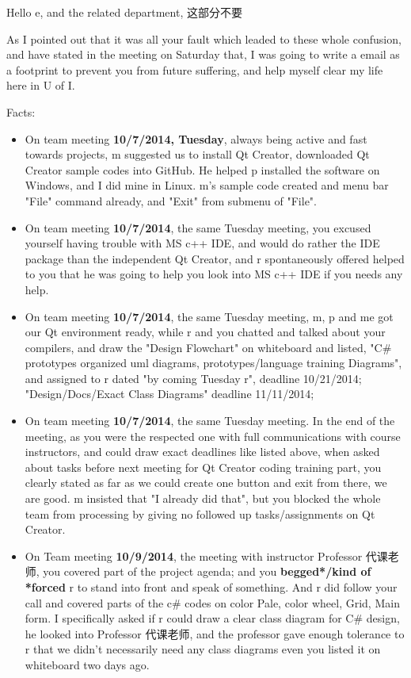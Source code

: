 \documentclass[9pt,b5paper]{article}
\begin{document}
Hello e, and the related department, 这部分不要

As I pointed out that it was all your fault which leaded to these whole confusion, and have stated in the meeting on Saturday that, I was going to write a email as a footprint to prevent you from future suffering, and help myself clear my life here in U of I. 

Facts:

\begin{itemize}
\item On team meeting \textbf{10/7/2014, Tuesday}, always being active and fast towards projects, m suggested us to install Qt Creator, downloaded Qt Creator sample codes into GitHub. He helped p installed the software on Windows, and I did mine in Linux. m's sample code created and menu bar "File" command already, and "Exit" from submenu of "File".
\item On team meeting \textbf{10/7/2014}, the same Tuesday meeting, you excused yourself having trouble with MS c++ IDE, and would do rather the IDE package than the independent Qt Creator, and r spontaneously offered helped to you that he was going to help you look into MS c++ IDE if you needs any help.

\item On team meeting \textbf{10/7/2014}, the same Tuesday meeting, m, p and me got our Qt environment ready, while r and you chatted and talked about your compilers, and draw the "Design Flowchart" on whiteboard and listed, "C\# prototypes organized uml diagrams, prototypes/language training Diagrams", and assigned to r dated "by coming Tuesday r", deadline 10/21/2014; "Design/Docs/Exact Class Diagrams" deadline 11/11/2014;

\item On team meeting \textbf{10/7/2014}, the same Tuesday meeting. In the end of the meeting, as you were the respected one with full communications with course instructors, and could draw exact deadlines like listed above, when asked about tasks before next meeting for Qt Creator coding training part, you clearly stated as far as we could create one button and exit from there, we are good. m insisted that "I already did that", but you blocked the whole team from processing by giving no followed up tasks/assignments on Qt Creator.

\item On Team meeting \textbf{10/9/2014}, the meeting with instructor Professor 代课老师, you covered part of the project agenda; and you \textbf{begged*/kind of *forced} r to stand into front and speak of something. And r did follow your call and covered parts of the c\# codes on color Pale, color wheel, Grid, Main form. I specifically asked if r could draw a clear class diagram for C\# design, he looked into Professor 代课老师, and the professor gave enough tolerance to r that we didn't necessarily need any class diagrams even you listed it on whiteboard two days ago.


\end{itemize}
\end{document}

